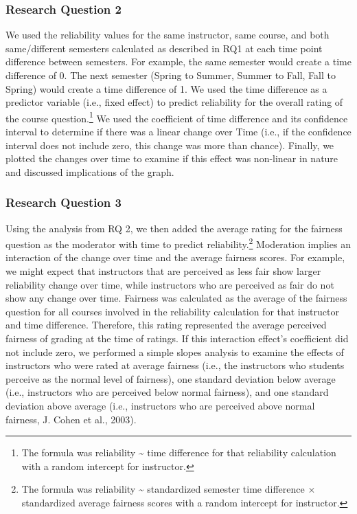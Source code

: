 \documentclass[
  man]{apa7}
\begin{document}
\hypertarget{research-question-2}{%
\subsubsection{Research Question 2}\label{research-question-2}}

We used the reliability values for the same instructor, same course, and
both same/different semesters calculated as described in RQ1 at each
time point difference between semesters. For example, the same semester
would create a time difference of 0. The next semester (Spring to
Summer, Summer to Fall, Fall to Spring) would create a time difference
of 1. We used the time difference as a predictor variable (i.e., fixed
effect) to predict reliability for the overall rating of the course
question.\footnote{The formula was reliability \textasciitilde{} time difference for that
  reliability calculation with a random intercept for instructor.} We
used the coefficient of time difference and its confidence interval to
determine if there was a linear change over Time (i.e., if the
confidence interval does not include zero, this change was more than
chance). Finally, we plotted the changes over time to examine if this
effect was non-linear in nature and discussed implications of the graph.

\hypertarget{research-question-3}{%
\subsubsection{Research Question 3}\label{research-question-3}}

Using the analysis from RQ 2, we then added the average rating for the
fairness question as the moderator with time to predict
reliability.\footnote{The formula was reliability \textasciitilde{} standardized semester time
  difference \(\times\) standardized average fairness scores with a random
  intercept for instructor.} Moderation implies an interaction of the
change over time and the average fairness scores. For example, we might
expect that instructors that are perceived as less fair show larger
reliability change over time, while instructors who are perceived as
fair do not show any change over time. Fairness was calculated as the
average of the fairness question for all courses involved in the
reliability calculation for that instructor and time difference.
Therefore, this rating represented the average perceived fairness of
grading at the time of ratings. If this interaction effect's coefficient
did not include zero, we performed a simple slopes analysis to examine
the effects of instructors who were rated at average fairness (i.e., the
instructors who students perceive as the normal level of fairness), one
standard deviation below average (i.e., instructors who are perceived
below normal fairness), and one standard deviation above average (i.e.,
instructors who are perceived above normal fairness, J. Cohen et al., 2003).
\end{document}
